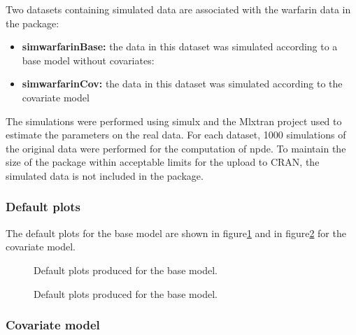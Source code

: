 Two datasets containing simulated data are associated with the {\sf warfarin} data in the package:
\begin{itemize}
\item {\bf simwarfarinBase:} the data in this dataset was simulated according to a base model without covariates:
\item {\bf simwarfarinCov:} the data in this dataset was simulated according to the covariate model
\end{itemize}
The simulations were performed using {\sf simulx} and the Mlxtran project used to estimate the parameters on the real data. For each dataset, 1000 simulations of the original data were performed for the computation of npde. To maintain the size of the package within acceptable limits for the upload to CRAN, the simulated data is not included in the package.

\subsubsection{Default plots}

\hskip 18pt The default plots for the base model are shown in figure\~\ref{fig:warfDefault} and in figure\~\ref{fig:warfCovDefault} for the covariate model.

\begin{figure}[!h]
\par\kern -1cm
\begin{center}
\end{center}
\par\kern -6.5cm
\caption{Default plots produced for the base model.}\label{fig:warfDefault}
\end{figure}

\begin{figure}[!h]
\par\kern -1cm
\begin{center}
\end{center}
\par\kern -6.5cm
\caption{Default plots produced for the base model.}\label{fig:warfCovDefault}
\end{figure}

\subsubsection{Covariate model}

